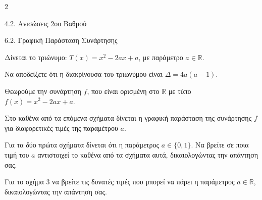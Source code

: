 \begin{ylh}{2}
    \item 4.2. Ανισώσεις 2ου Βαθμού
    \item 6.2. Γραφική Παράσταση Συνάρτησης
\end{ylh}

Δίνεται το τριώνυμο: $T(x) = x^2 - 2a x + a$, με παράμετρο $a \in \mathbb{R}$.

\begin{alist}
\item Να αποδείξετε ότι η διακρίνουσα του τριωνύμου είναι $\Delta = 4a(a - 1)$.
\item Θεωρούμε την συνάρτηση $f$, που είναι ορισμένη στο $\mathbb{R}$ με τύπο $f(x) = x^2 - 2a x + a$.

Στο καθένα από τα επόμενα σχήματα δίνεται η γραφική παράσταση της συνάρτησης $f$ για διαφορετικές τιμές της παραμέτρου $a$.

\begin{rlist}
\item Για τα δύο πρώτα σχήματα δίνεται ότι η παράμετρος $a \in \{0, 1\}$. Να βρείτε σε ποια τιμή του $a$ αντιστοιχεί το καθένα από τα σχήματα αυτά, δικαιολογώντας την απάντηση σας.
\item Για το σχήμα 3 να βρείτε τις δυνατές τιμές που μπορεί να πάρει η παράμετρος $a \in \mathbb{R}$, δικαιολογώντας την απάντηση σας.
\end{rlist}
\end{alist}

